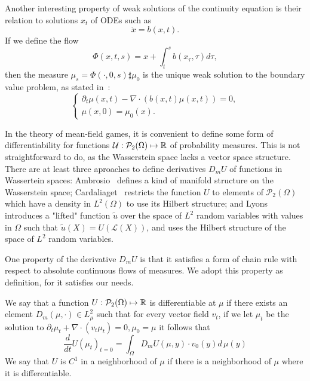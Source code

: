 Another interesting property of weak solutions of the continuity equation is their relation to solutions $x_t$ of ODEs such as
\begin{equation}
    \dot x = b(x,t).
\end{equation}
If we define the flow 
\begin{equation}
    \Phi(x,t,s) = x + \int_t^s b(x_\tau, \tau) d\tau, 
\end{equation}
then the measure $\mu_s = \Phi(\cdot, 0, s) \sharp \mu_0$ is the unique weak solution to the boundary value problem, as stated in~\cite{cardaliaguet2010notes}:
\begin{equation}
    \begin{cases}
        \partial_t \mu(x,t) - \nabla \cdot ( b(x,t) \mu(x,t) ) = 0,\\
        \mu(x,0) =  \mu_0(x). 
    \end{cases}
\end{equation}


In the theory of mean-field games, it is convenient to define some
form of differentiability for functions
 $\mathcal{U} : \mathcal{P}_2(\Omega) \mapsto \mathbb{R}$ of probability measures.
 This is not straightforward to do, as the Wasserstein space lacks a vector space
 structure.
There are at least three aproaches to define derivatives $D_m U$ of functions in
Wassertein spaces: 
Ambrosio~\cite{ambrosio2005gradient} defines a kind of manifold structure
on the Wasserstein space;
Cardaliaget~\cite{cardaliaguet2019master} restricts the 
function $U$ to elements of $\mathcal{P}_2(\Omega)$ which have a density in 
$L^2(\Omega)$ to use its Hilbert structure; and 
Lyons~\cite{cardaliaguet2010notes} introduces a "lifted" function $\tilde u$ over the space of $L^2$ random variables with values
in $\Omega$ such that $\tilde u(X) = U(\mathcal{L}(X))$, and uses the Hilbert structure
of the space of $L^2$ random variables.

One property of the derivative $D_m U$ is that it satisfies a form of chain rule with respect to absolute continuous flows of measures. We adopt this property as definition, for it satisfies our needs.
\begin{definition}
We say that a function $U : \mathcal{P}_2(\Omega) \mapsto \mathbb{R}$ is differentiable 
at $\mu$ if there exists an element $D_m(\mu, \cdot) \in L^2_\mu$
such that for every vector field $v_t$, if we let $\mu_t$ be the solution 
to $\partial_t \mu_t + \nabla \cdot(v_t \mu_t) = 0, \mu_0 = \mu$
it follows that
\begin{equation}\label{wass:measure_derivative_chain_rule}
    \frac{d}{dt} U(\mu_t)_{t = 0} = \int_\Omega D_m U(\mu, y) \cdot v_0(y) d\, \mu(y)
\end{equation}
We say that $U$ is $C^1$ in a neighborhood of $\mu$ if there is a neighborhood of $\mu$ where it is differentiable.
\end{definition}

